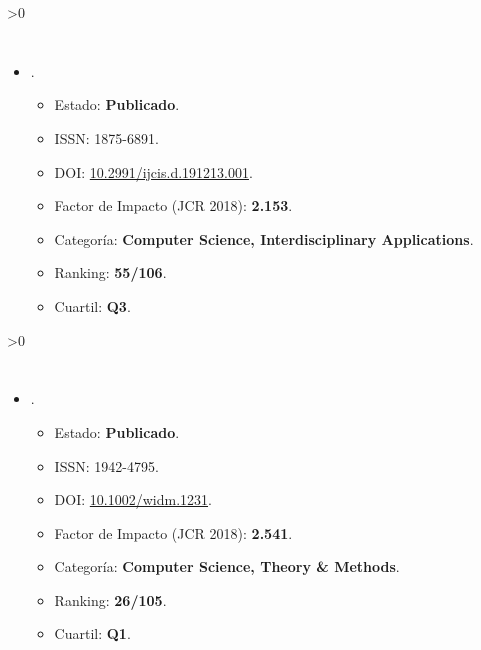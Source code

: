 \documentclass[c5paper,10pt,twoside]{book}	   	%
\newcounter{incluirPDF}
\newcommand{\doi}[1]{\href{https://doi.org/#1}{#1}}
\newcommand{\incluirPaper}[2]{
	\ifnum\value{incluirPDF}>0 {
		
		\clearpage
		
		
		
		\cleardoublepage
		
	}\fi
}
\begin{document}
\incluirPaper{-}{./Papers/2016-Garcia-RJournal}





\section{}

\begin{itemize}
	\item {}.
	
	\begin{itemize}
		\item Estado: \textbf{Publicado}.
		\item ISSN: 1875-6891.
		\item DOI: \doi{10.2991/ijcis.d.191213.001}.
		\item Factor de Impacto (JCR 2018): \textbf{2.153}.
		\item Categoría: \textbf{Computer Science, Interdisciplinary Applications}.
		\item Ranking: \textbf{55/106}.
		\item Cuartil: \textbf{Q3}.
	\end{itemize}
\end{itemize}

\incluirPaper{-}{./Papers/2019_Luna_MIL}




\section{}

\begin{itemize}
	\item {}.
	
	\begin{itemize}
		\item Estado: \textbf{Publicado}.
		\item ISSN: 1942-4795.
		\item DOI: \doi{10.1002/widm.1231}.
		\item Factor de Impacto (JCR 2018): \textbf{2.541}.
		\item Categoría: \textbf{Computer Science, Theory \& Methods}.
		\item Ranking: \textbf{26/105}.
		\item Cuartil: \textbf{Q1}.
	\end{itemize}
\end{itemize}
\end{document}
